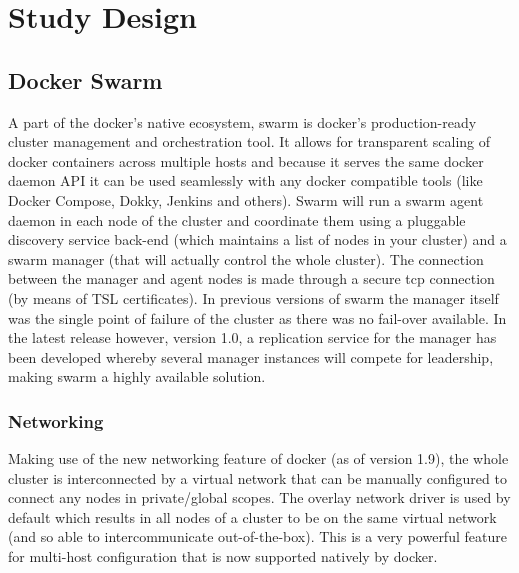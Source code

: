 \documentclass{article}
\begin{document}
\section{Study Design}
\lipsum[1]

\subsection{Docker Swarm}
A part of the docker's native ecosystem, swarm is docker's production-ready cluster management and orchestration tool. It allows for transparent scaling of docker containers across multiple hosts and because it serves the same docker daemon API it can be used seamlessly with any docker compatible tools (like Docker Compose, Dokky, Jenkins and others).
Swarm will run a swarm agent daemon in each node of the cluster and coordinate them using a pluggable discovery service back-end (which maintains a list of nodes in your cluster) and a swarm manager (that will actually control the whole cluster). The connection between the manager and agent nodes is made through a secure tcp connection (by means of TSL certificates). In previous versions of swarm the manager itself was the single point of failure of the cluster as there was no fail-over available. In the latest release however, version 1.0, a replication service for the manager has been developed whereby several manager instances will compete for leadership, making swarm a highly available solution.
\subsubsection{Networking}
Making use of the new networking feature of docker (as of version 1.9), the whole cluster is interconnected by a virtual network that can be manually configured to connect any nodes in private/global scopes. The overlay network driver is used by default which results in all nodes of a cluster to be on the same virtual network (and so able to intercommunicate out-of-the-box). This is a very powerful feature for multi-host configuration that is now supported natively by docker.
\end{document}
